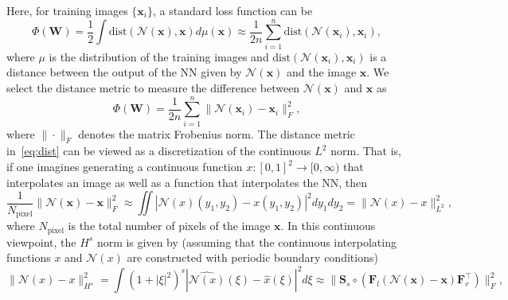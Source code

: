 Here, for training images $\{\mathbf{x}_i\}$, a standard loss function can be 
\[
    \Phi(\mathbf{W}) = \frac{1}{2}\int \text{dist} ( \mathcal{N}(\mathbf{x}) , \mathbf{x} ) d\mu(\mathbf{x}) \approx \frac{1}{2n} \sum_{i=1}^n \text{dist} ( \mathcal{N}(\mathbf{x}_i) , \mathbf{x}_i ),
\]
where $\mu$ is the distribution of the training images and $\text{dist} ( \mathcal{N}(\mathbf{x}_i) , \mathbf{x}_i )$ is a distance between the output of the NN given by $\mathcal{N}(\mathbf{x})$ and the image $\mathbf{x}$. %
We select the distance metric to measure the difference between $\mathcal{N}(\mathbf{x})$ and $\mathbf{x}$ as
\begin{equation}
\Phi(\mathbf{W}) =  \frac{1}{2n} \sum_{i=1}^n \|  \mathcal{N}(\mathbf{x}_i)- \mathbf{x}_i \|_F^2 , 
\label{eq:dist} 
\end{equation} 
where $\|\cdot \|_F$ denotes the matrix Frobenius norm. The distance metric in~\cref{eq:dist} can be viewed as  a discretization of the continuous $L^2$ norm. That is, if one imagines generating a continuous function $x: [0,1]^2 \rightarrow [0,\infty)$ that interpolates an image as well as a function that interpolates the NN, then 
\begin{equation*}
  \frac{1}{N_{\text{pixel}}}\|\mathcal{N}(\mathbf{x})- \mathbf{x} \|_F^2 \approx \iint | \mathcal{N}(x) (y_1, y_2) - x(y_1,y_2)|^2 dy_1 dy_2 = \|\mathcal{N}(x) - x\|_{L^2}^2,
\end{equation*}
where $N_{\text{pixel}}$ is the total number of pixels of the image $\mathbf{x}$. In this continuous viewpoint, the $H^s$ norm is given by (assuming that the continuous interpolating functions $x$ and $\mathcal{N}(x)$ are constructed with periodic boundary conditions)
\begin{equation}\label{eq.sobolevpicture}
    \| \mathcal{N}(x) - x \|^2_{H^s} = \int (1+|\xi|^2)^s | \widehat {\mathcal{N}(x)}(\xi) - \widehat{x}(\xi) |^2 d\xi \approx   \| \mathbf{S}_s \circ \left(\mathbf{F}_l \left( \mathcal{N}(\mathbf{x})- \mathbf{x}\right) \mathbf{F}_r^\top\right) \|_F^2,
\end{equation}
